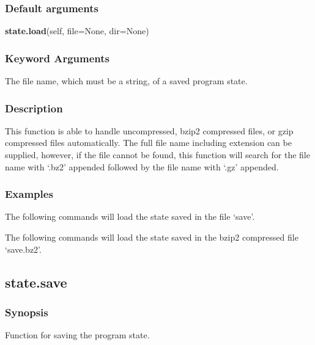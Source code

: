 \subsubsection{Default arguments}

\textsf{\textbf{state.load}(self, file=None, dir=None)}


\subsubsection{Keyword Arguments}

  The file name, which must be a string, of a saved program state.


\subsubsection{Description}

This function is able to handle uncompressed, bzip2 compressed files, or gzip compressed
files automatically.  The full file name including extension can be supplied, however, if
the file cannot be found, this function will search for the file name with `.bz2' appended
followed by the file name with `.gz' appended.


\subsubsection{Examples}

The following commands will load the state saved in the file `save'.



The following commands will load the state saved in the bzip2 compressed file `save.bz2'.





\newpage

\subsection{state.save}


\subsubsection{Synopsis}

Function for saving the program state.

